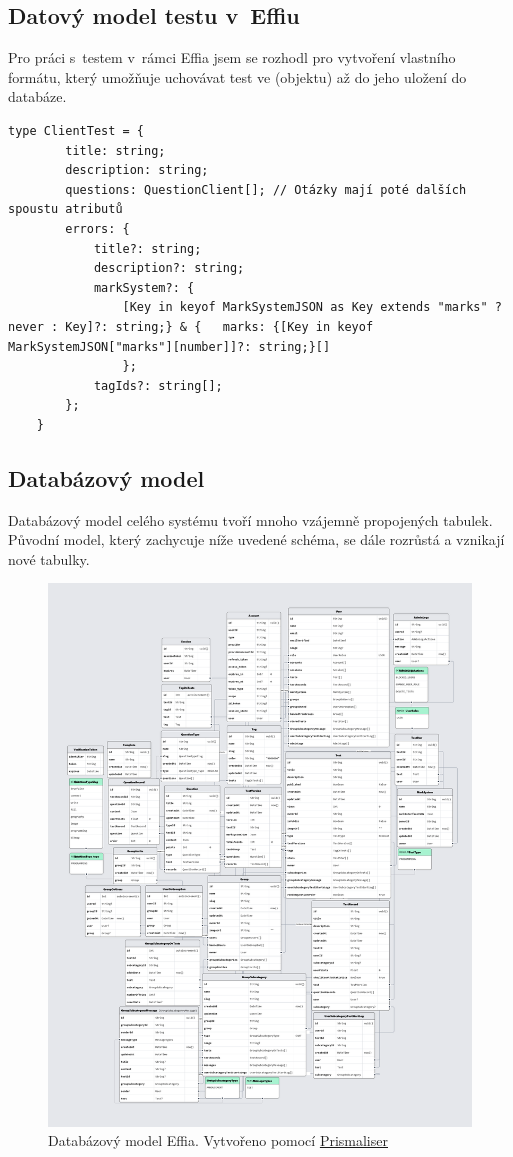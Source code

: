 \documentclass[12pt, a4paper,
openright
]{report}
\begin{document}
\subsection{Datový model testu v~Effiu}
Pro práci s~testem v~rámci Effia jsem se rozhodl pro vytvoření vlastního formátu, který umožňuje uchovávat test ve  (objektu) až do jeho uložení do databáze.

\begin{lstlisting}[style=ES6, caption=Ukázka z +page.server.ts, label=test_format]
	type ClientTest = {
		title: string;
		description: string;
		questions: QuestionClient[]; // Otázky mají poté dalších spoustu atributů
		errors: {
			title?: string;
			description?: string;
			markSystem?: {
				[Key in keyof MarkSystemJSON as Key extends "marks" ? never : Key]?: string;} & {	marks: {[Key in keyof MarkSystemJSON["marks"][number]]?: string;}[]
				};
			tagIds?: string[];
		};
	}
\end{lstlisting}

\subsection{Databázový model}
Databázový model celého systému tvoří mnoho vzájemně propojených tabulek. Původní model, který zachycuje níže uvedené schéma, se dále rozrůstá a vznikají nové tabulky.

	\begin{figure}[H]
		\centering %
		\includegraphics[width=0.9\linewidth]{image/schema.png} 
		\caption{Databázový model Effia. Vytvořeno pomocí \href{https://github.com/Ovyerus/prismaliser}{Prismaliser}} %
		\label{fig:schema} %
	\end{figure}
\end{document}
